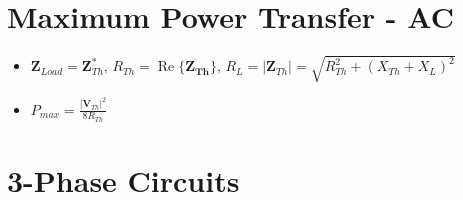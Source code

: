 \documentclass[10pt,letterpaper,final,twoside,notitlepage]{article}
\renewcommand{\Re}{\operatorname{Re}} %
\begin{document}
\section*{Maximum Power Transfer - AC}
	\begin{itemize}[noitemsep, nolistsep]
		\item $\mathbf{Z}_{Load}=\mathbf{Z}_{Th}^*$, $R_{Th}=\Re\lbrace\mathbf{Z_{Th}}\rbrace$, $R_L= \lvert \mathbf{Z}_{Th} \rvert = \sqrt{R_{Th}^2+\left( X_{Th}+X_{L}\right)^2}$
		\item $P_{max}=\frac{\lvert\mathbf{V}_{Th}\rvert^2}{8R_{Th}}$
	\end{itemize}
	\vspace{-4.5mm}
\section*{3-Phase Circuits} \label{sec:3-Phase}
\end{document}

